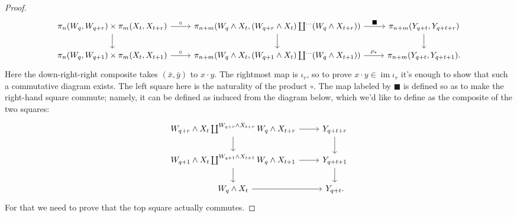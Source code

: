\documentclass{amsart}
\theoremstyle{definition}
\newcommand{\im}{\operatorname{im}}
\begin{document}
\begin{proof}
\[\begin{tikzcd}
	{\pi_n(W_q, W_{q+r}) \times \pi_m(X_t, X_{t+r})} & {\pi_{n+m}(W_q \wedge X_t, (W_{q+r} \wedge X_t) \coprod^{\ldots} (W_q \wedge X_{t+r}))} & {\pi_{n+m}(Y_{q+t}, Y_{q+t+r})} \\
	{\pi_n(W_q, W_{q+1}) \times \pi_m(X_t, X_{t+1})} & {\pi_{n+m}(W_q \wedge X_t, (W_{q+1} \wedge X_t) \coprod^{\ldots} (W_q \wedge X_{t+1}))} & {\pi_{n+m}(Y_{q+t}, Y_{q+t+1}).}
	\arrow["\circ", from=1-1, to=1-2]
	\arrow[from=1-1, to=2-1]
	\arrow["\blacksquare", from=1-2, to=1-3]
	\arrow[from=1-2, to=2-2]
	\arrow[from=1-3, to=2-3]
	\arrow["\circ", from=2-1, to=2-2]
	\arrow["{\rho_*}", from=2-2, to=2-3]
\end{tikzcd}\]
Here the down-right-right composite takes $(\bar{x},\bar{y})$ to $x \cdot y$. The rightmost map is $\iota_r$, so to prove $x \cdot y \in \im \iota_r$ it's enough to show that such a commutative diagram exists.
The left square here is the naturality of the product $\circ$.
The map labeled by $\blacksquare$ is defined so as to make the right-hand square commute; namely, it can be defined as induced from the diagram below, which we'd like to define as the composite of the two squares:
\[\begin{tikzcd}
	{W_{q+r} \wedge X_t \coprod^{W_{q+r} \wedge X_{t+r}} W_q \wedge X_{t+r}} & {Y_{q+t+r}} \\
	{W_{q+1} \wedge X_t \coprod^{W_{q+1} \wedge X_{t+1}} W_{q} \wedge X_{t+1}} & {Y_{q+t+1}} \\
	{W_q \wedge X_t} & {Y_{q+t}.}
	\arrow[from=2-2, to=3-2]
	\arrow[from=1-2, to=2-2]
	\arrow[from=1-1, to=1-2]
	\arrow[from=2-1, to=2-2]
	\arrow[from=3-1, to=3-2]
	\arrow[from=2-1, to=3-1]
	\arrow[from=1-1, to=2-1]
\end{tikzcd}\]
For that we need to prove that the top square actually commutes.


\end{proof}
\end{document}
